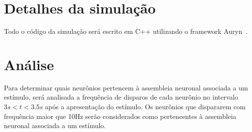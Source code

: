 \section{Detalhes da simulação}

Todo o código da simulação será escrito em C++ utilizando o framework Auryn~\cite{zenkeLimits2014}.

\section{Análise}

Para determinar quais neurônios pertencem à assembleia neuronal associada a um estímulo, será analisada a frequência de disparos de
cada neurônio no intervalo $3s < t < 3.5s$ após a apresentação do estímulo. Os neurônios que dispararem com frequência maior que
10Hz serão considerados como pertencentes à assembleia neuronal associada a um estímulo.

